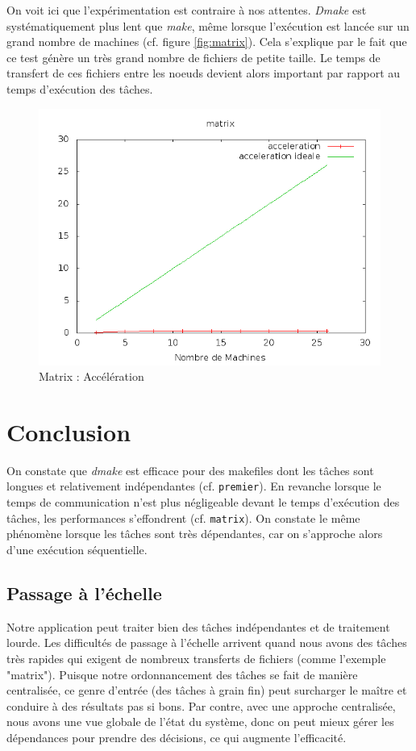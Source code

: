\documentclass[a4paper,12pt,twoside]{article}
\begin{document}
On voit ici que l'expérimentation est contraire à nos
attentes. \emph{Dmake} est systématiquement plus lent que \emph{make},
même lorsque l'exécution est lancée sur un grand nombre de
machines (cf. figure \ref{fig:matrix}). Cela s'explique par le fait que ce test génère un très grand
nombre de fichiers de petite taille. Le temps de transfert de ces
fichiers entre les noeuds devient alors important par rapport au
temps d'exécution des tâches.

\begin{figure}[h]
  \centering
  \includegraphics[scale=0.5]{acceleration_matrix.png}
  \caption{Matrix : Accélération}
  \label{fig:matrixAcc}
\end{figure}

\section*{Conclusion}
On constate que \emph{dmake} est efficace pour des makefiles dont les
tâches sont longues et relativement indépendantes
(cf. \texttt{premier}). En revanche lorsque le temps de communication
n'est plus négligeable devant le temps d'exécution des tâches, les
performances s'effondrent (cf. \texttt{matrix}). On constate le même phénomène lorsque les
tâches sont très dépendantes, car on s'approche alors d'une exécution séquentielle.

\subsection*{Passage à l'échelle}
Notre application peut traiter bien des tâches indépendantes et de traitement lourde. Les difficultés de passage à l'échelle arrivent quand nous avons des tâches très rapides qui exigent de nombreux transferts de fichiers (comme l'exemple "matrix"). Puisque notre ordonnancement des tâches se fait de manière centralisée, ce genre d'entrée (des tâches à grain fin) peut surcharger le maître et conduire à des résultats pas si bons. Par contre, avec une approche centralisée, nous avons une vue globale de l'état du système, donc on peut mieux gérer les dépendances pour prendre des décisions, ce qui augmente l'efficacité.
\end{document}
